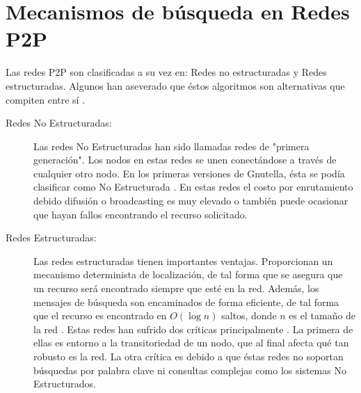 \section{Mecanismos de búsqueda en Redes P2P}
Las redes P2P son clasificadas a su vez en: Redes no estructuradas y Redes estructuradas. Algunos han aseverado que éstos algoritmos son alternativas que compiten entre sí \cite{rfc4981}.

\begin{description}

\item[Redes No Estructuradas: ]
Las redes No Estructuradas han sido llamadas redes de "primera generación". Los nodos en estas redes se unen conectándose a través de cualquier otro nodo. En los primeras versiones de Gnutella, ésta se podía clasificar como No Estructurada \cite{rfc4981}. En estas redes el costo por enrutamiento debido difusión o broadcasting es muy elevado o también puede ocasionar que hayan fallos encontrando el recurso solicitado. \cite{rfc4981}

\item[Redes Estructuradas: ]
Las redes estructuradas tienen importantes ventajas. Proporcionan un mecanismo determinista de localización, de tal forma que se asegura que un recurso será encontrado siempre que esté en la red. Además, los mensajes de búsqueda son encaminados de forma eficiente, de tal forma que el recurso es encontrado en $O(\log n)$ saltos, donde $n$ es el tamaño de la red \cite{wiki_p2p}. Estas redes han sufrido dos críticas principalmente \cite{rfc4981}. La primera de ellas es entorno a la transitoriedad de un nodo, que al final afecta qué tan robusto es la red. La otra crítica es debido a que éstas redes no soportan búsquedas por palabra clave ni consultas complejas como los sistemas No Estructurados. 

\end{description}